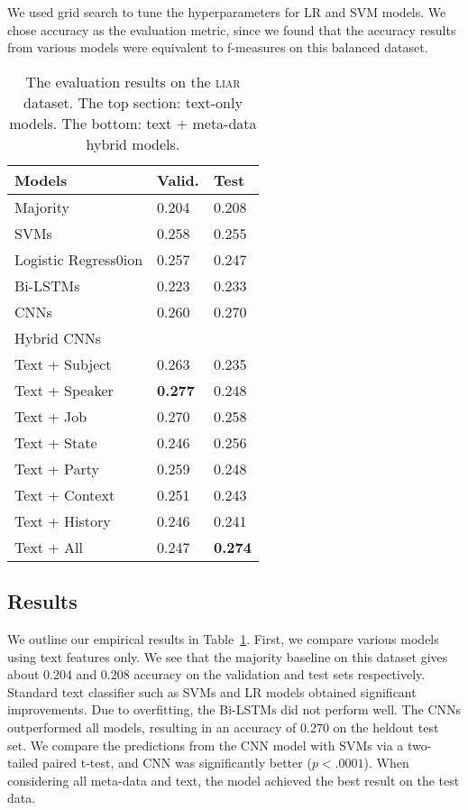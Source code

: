 \documentclass[11pt,a4paper]{article}
\begin{document}
We used grid search to tune the hyperparameters for LR and SVM models. We chose accuracy as the evaluation metric, since we found that the accuracy results from various models were equivalent to f-measures on this balanced dataset.
\begin{table}[t]
\begin{center}
\begin{tabular}{lll}

\hline
Models & Valid. & Test\\
\hline
Majority & 0.204 & 0.208\\
SVMs & 0.258 & 0.255\\
Logistic Regress0ion & 0.257 & 0.247\\
Bi-LSTMs & 0.223 & 0.233\\
CNNs & 0.260 & 0.270\\
\hline
Hybrid CNNs& &\\
Text + Subject & 0.263 & 0.235\\
Text + Speaker & \textbf{0.277} & 0.248\\
Text + Job & 0.270 & 0.258\\
Text + State & 0.246 & 0.256\\
Text + Party & 0.259 & 0.248\\
Text + Context & 0.251 & 0.243\\
Text + History & 0.246 & 0.241\\
Text + All & 0.247 & \textbf{0.274}\\
\hline
\end{tabular}
\caption{The evaluation results on the \textsc{liar} dataset. The top section: text-only models. The bottom: text + meta-data hybrid models.}
\label{tab:eval}
\end{center}
\end{table}

\subsection{Results}
We outline our empirical results in Table~\ref{tab:eval}.
First, we compare various models using text features only.
We see that the majority baseline on this dataset gives about 0.204 and 0.208 accuracy on the validation and test sets respectively. 
Standard text classifier such as SVMs and LR models obtained significant improvements. Due to overfitting, the Bi-LSTMs did not perform well. The CNNs outperformed all models, resulting in an accuracy of 0.270 on the heldout test set. We compare the predictions from the CNN model with SVMs via a two-tailed paired t-test, and CNN was significantly better ($p<.0001$).
When considering all meta-data and text, the model achieved the best result on the test data.
\end{document}
